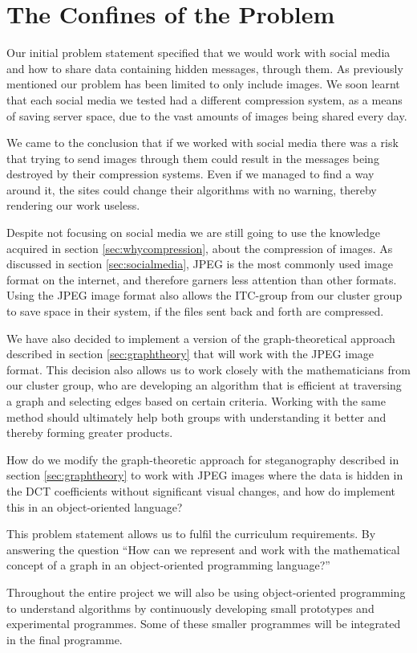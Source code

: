 \section{The Confines of the Problem}
\label{sec:confines}
Our initial problem statement specified that we would work with social media and how to share data containing hidden messages, through them.
As previously mentioned our problem has been limited to only include images.
We soon learnt that each social media we tested had a different compression system, as a means of saving server space, due to the vast amounts of images being shared every day.

We came to the conclusion that if we worked with social media there was a risk that trying to send images through them could result in the messages being destroyed by their compression systems.
Even if we managed to find a way around it, the sites could change their algorithms with no warning, thereby rendering our work useless.

Despite not focusing on social media we are still going to use the knowledge acquired in section \ref{sec:whycompression}, about the compression of images. 
As discussed in section \ref{sec:socialmedia}, JPEG is the most commonly used image format on the internet, and therefore garners less attention than other formats.
Using the JPEG image format also allows the ITC-group from our cluster group to save space in their system, if the files sent back and forth are compressed.

We have also decided to implement a version of the graph-theoretical approach described in section \ref{sec:graphtheory} that will work with the JPEG image format.
This decision also allows us to work closely with the mathematicians from our cluster group, who are developing an algorithm that is efficient at traversing a graph and selecting edges based on certain criteria.
Working with the same method should ultimately help both groups with understanding it better and thereby forming greater products.


\vspace{5mm}
\begin{centering}
	\begin{tcolorbox}[center title, title=Problem Statement, width=.8\textwidth]
How do we modify the graph-theoretic approach for steganography described in section \ref{sec:graphtheory} to work with JPEG images where the data is hidden in the DCT coefficients without significant visual changes, and how do implement this in an object-oriented language?
	\end{tcolorbox}
\end{centering}

This problem statement allows us to fulfil the curriculum requirements. By answering the question
``How can we represent and work with the mathematical concept of a graph in an object-oriented programming language?''


Throughout the entire project we will also be using object-oriented programming to understand algorithms by continuously developing small prototypes and experimental programmes.
Some of these smaller programmes will be integrated in the final programme.

